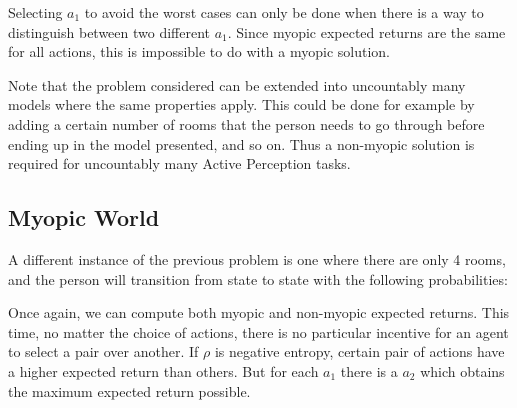 Selecting $a_1$ to avoid the worst cases can only be done when there is a way to distinguish between
two different $a_1$.  Since myopic expected returns are the same for all actions, this is impossible
to do with a myopic solution.

Note that the problem considered can be extended into uncountably many models where the same
properties apply. This could be done for example by adding a certain number of rooms that the person
needs to go through before ending up in the model presented, and so on. Thus a non-myopic solution
is required for uncountably many Active Perception tasks.

\subsection{Myopic World}

A different instance of the previous problem is one where there are only 4 rooms, and the person
will transition from state to state with the following probabilities:

\begin{center}
\end{center}

Once again, we can compute both myopic and non-myopic expected returns. This time, no matter the
choice of actions, there is no particular incentive for an agent to select a pair over another. If
$\rho$ is negative entropy, certain pair of actions have a higher expected return than others. But
for each $a_1$ there is a $a_2$ which obtains the maximum expected return possible.

